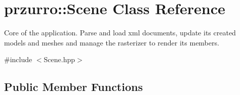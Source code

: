 \hypertarget{classprzurro_1_1_scene}{}\section{przurro\+::Scene Class Reference}
\label{classprzurro_1_1_scene}


Core of the application. Parse and load xml documents, update it\textquotesingle{}s created models and meshes and manage the rasterizer to render it\textquotesingle{}s members.  




{\ttfamily \#include $<$Scene.\+hpp$>$}

\subsection*{Public Member Functions}
